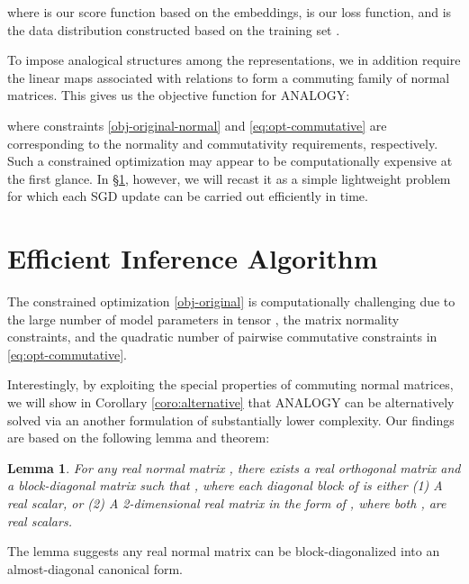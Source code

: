 \documentclass{article}
\newtheorem{lemma}[theorem]{Lemma}
\begin{document}
where  is our score function based on the embeddings,
 is our loss function,
and  is the data distribution constructed based on the training set .

To impose analogical structures among the representations,
we in addition require the linear maps associated with relations
to form a commuting family of normal matrices.
This gives us the objective function for ANALOGY:

where constraints \eqref{obj-original-normal} and \eqref{eq:opt-commutative} are corresponding to the normality and commutativity requirements,
respectively.
Such a constrained optimization may appear to be computationally expensive at the first glance.
In \S \ref{sec:algorithm}, however, we will recast it as a simple lightweight problem
for which each SGD update can be carried out efficiently in  time.

 \section{Efficient Inference Algorithm}
\label{sec:algorithm}

The constrained optimization \eqref{obj-original}
is computationally challenging due to the large number of model parameters in tensor ,
the matrix normality constraints,
and the quadratic number of pairwise commutative constraints in \eqref{eq:opt-commutative}.


Interestingly,
by exploiting the special properties of commuting normal matrices,
we will show in Corollary \ref{coro:alternative} that ANALOGY can be alternatively solved
via an another formulation of substantially lower complexity.
Our findings are based on the following lemma and theorem:

\begin{lemma} \cite{wilkinson1965algebraic}
    For any real normal matrix ,
    there exists a real orthogonal matrix  and a block-diagonal matrix  such that , where each diagonal block of  is either (1) A real scalar, or (2) A 2-dimensional real matrix in the form of
            , where both ,  are real scalars.


    \label{lem:diagonal}
\end{lemma}
The lemma suggests any real normal matrix can be block-diagonalized
into an almost-diagonal canonical form.
\end{document}
